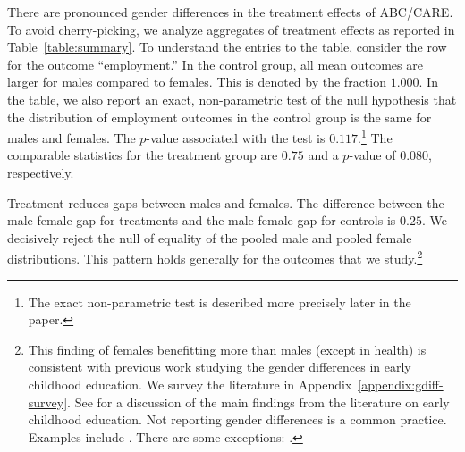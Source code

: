 There are pronounced gender differences in the treatment effects of ABC/CARE. To avoid cherry-picking, we analyze aggregates of treatment effects as reported in Table~\ref{table:summary}. To understand the entries to the table, consider the row for the outcome ``employment.'' In the control group, all mean outcomes are larger for males compared to females. This is denoted by the fraction $1.000$. In the table, we also report an exact, non-parametric test of the null hypothesis that the distribution of employment outcomes in the control group is the same for males and females. The $p$-value associated with the test is $0.117$.\footnote{The exact non-parametric test is described more precisely later in the paper.} The comparable statistics for the treatment group are $0.75$ and a $p$-value of $0.080$, respectively.

Treatment reduces gaps between males and females. The difference between the male-female gap for treatments and the male-female gap for controls is $0.25$. We decisively reject the null of equality of the pooled male and pooled female distributions. This pattern holds generally for the outcomes that we study.\footnote{This finding of females benefitting more than males (except in health) is consistent with previous work studying the gender differences in early childhood education. We survey the literature in Appendix~\ref{appendix:gdiff-survey}. See \citet{Elango_Hojman_etal_2016_Early-Edu} for a discussion of the main findings from the literature on early childhood education. Not reporting gender differences is a common practice. Examples include \citet{Schweinhart_Montie_ea_2005_BOOKlifetime,Bernal_Keane_2011_JoLE,Cascio_Schanzenbach_2013_ImpactsExpandingAccess,Bitler_et_al_2014_Head_Start_Unpublished,Kline_Walters_2016_QJE}. There are some exceptions: \citet{Heckman_2005_Perry,Anderson_2008_JASA,Heckman_Moon_etal_2010_QE,Campbell_Conti_etal_2014_EarlyChildhoodInvestments,Garcia_Heckman_Leaf_etal_2017_Comp_CBA_Unpublished}.}

